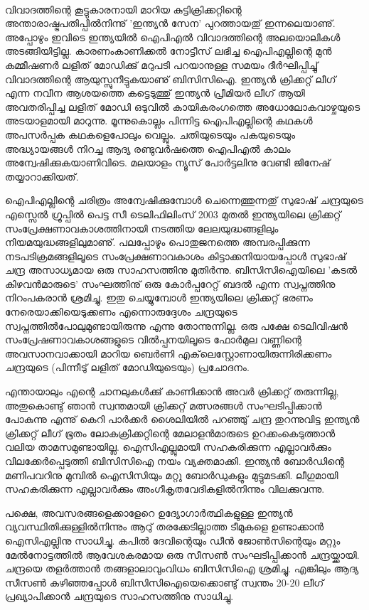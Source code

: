 ﻿
\enlargethispage{2\baselineskip}
\vskip 4pt

‌\hspace*{2em}\parbox{8.5cm}{
\small
വിവാദത്തിന്റെ കൂട്ടുകാരനായി മാറിയ കുട്ടിക്രിക്കറ്റിന്റെ അന്താരാഷ്ട്രപതിപ്പില്‍നിന്നു് 'ഇന്ത്യന്‍ സേന' പുറത്തായതു് 
ഇന്നലെയാണു്. അപ്പോഴും ഇവിടെ ഇന്ത്യയില്‍ ഐപിഎല്‍ വിവാദത്തിന്റെ അലയൊലികള്‍ അടങ്ങിയിട്ടില്ല. 
കാരണംകാണിക്കല്‍ നോട്ടീസ് ലഭിച്ച ഐപിഎല്ലിന്റെ മുന്‍ കമ്മീഷണര്‍ ലളിത് മോഡിക്കു് മറുപടി പറയാനുള്ള 
സമയം ദീര്‍ഘിപ്പിച്ചു് വിവാദത്തിന്റെ ആയുസ്സുനീട്ടുകയാണു് ബിസിസിഐ. ഇന്ത്യന്‍ ക്രിക്കറ്റ് ലീഗ് എന്ന നവീന 
ആശയത്തെ കട്ടെടുത്തു് ഇന്ത്യന്‍ പ്രീമിയര്‍ ലീഗ് ആയി അവതരിപ്പിച്ച ലളിത് മോഡി ഒടുവില്‍ കായികരംഗത്തെ 
അധോലോകവാഴ്ചയുടെ അടയാളമായി മാറുന്നു. മൂന്നുകൊല്ലം പിന്നിട്ട ഐപിഎല്ലിന്റെ കഥകള്‍ 
അപസര്‍പ്പക കഥകളെപോലും വെല്ലും. ചതിയുടെയും പകയുടെയും അദ്ധ്യായങ്ങള്‍ നിറച്ച ആദ്യ രണ്ടുവര്‍ഷത്തെ ഐപിഎല്‍ കാലം 
അന്വേഷിക്കുകയാണിവിടെ.  മലയാളം ന്യൂസ് പോര്‍ട്ടലിനു വേണ്ടി ജിനേഷ് തയ്യാറാക്കിയത്.
}

\vskip 14pt

\hspace*{-1.5em}ഐപിഎല്ലിന്റെ ചരിത്രം അന്വേഷിക്കുമ്പോള്‍ ചെന്നെത്തുന്നതു് സുഭാഷ് ചന്ദ്രയുടെ എസ്സെല്‍ ഗ്രൂപ്പില്‍ പെട്ട സീ ടെലിഫിലിംസ് 
2003 മുതല്‍ ഇന്ത്യയിലെ ക്രിക്കറ്റ് സംപ്രേക്ഷണാവകാശത്തിനായി നടത്തിയ ലേലയുദ്ധങ്ങളിലും നിയമയുദ്ധങ്ങളിലുമാണു്. 
പലപ്പോഴും പൊതുജനത്തെ അമ്പരപ്പിക്കുന്ന നടപടിക്രമങ്ങളിലൂടെ സംപ്രേക്ഷണാവകാശം കിട്ടാക്കനിയായപ്പോള്‍ 
സുഭാഷ് ചന്ദ്ര അസാധ്യമായ ഒരു സാഹസത്തിനു മുതിര്‍ന്നു. ബിസിസിഐയിലെ 'കടല്‍ കിഴവന്‍മാരുടെ' സംഘത്തിനു് 
ഒരു കോര്‍പ്പറേറ്റ് ബദല്‍ എന്ന സ്വപ്നത്തിനു നിറംപകരാന്‍ ശ്രമിച്ചു. ഇതു ചെയ്യുമ്പോള്‍ ഇന്ത്യയിലെ ക്രിക്കറ്റ് ഭരണം 
നേരെയാക്കിയെടുക്കണം എന്നൊരുദ്ദേശം ചന്ദ്രയുടെ സ്വപ്നത്തില്‍പോലുമുണ്ടായിരുന്നു എന്നു തോന്നുന്നില്ല. ഒരു പക്ഷേ 
ടെലിവിഷന്‍ സംപ്രേഷണാവകാശങ്ങളുടെ വില്‍പ്പനയിലൂടെ ഫോര്‍മുല വണ്ണിന്റെ അവസാനവാക്കായി മാറിയ ബെര്‍ണി 
എക്‌ലെസ്റ്റോണായിരുന്നിരിക്കണം ചന്ദ്രയുടെ (പിന്നീടു് ലളിത് മോഡിയുടെയും) പ്രചോദനം.

എന്തായാലും എന്റെ ചാനലുകള്‍ക്കു് കാണിക്കാന്‍ അവര്‍ ക്രിക്കറ്റ് തരുന്നില്ല, അതുകൊണ്ടു് ഞാന്‍ സ്വന്തമായി 
ക്രിക്കറ്റ് മത്സരങ്ങള്‍ സംഘടിപ്പിക്കാന്‍ പോകുന്നു എന്നു് കെറി പാര്‍ക്കര്‍ ശൈലിയില്‍ പറഞ്ഞു് ചന്ദ്ര തുറന്നുവിട്ട ഇന്ത്യന്‍ 
ക്രിക്കറ്റ് ലീഗ് ഭൂതം ലോകക്രിക്കറ്റിന്റെ മേലാളന്‍മാരുടെ ഉറക്കംകെടുത്താന്‍ വലിയ താമസമുണ്ടായില്ല. ഐസിഎല്ലുമായി 
സഹകരിക്കുന്ന എല്ലാവര്‍ക്കും വിലക്കേര്‍പ്പെടുത്തി ബിസിസിഐ നയം വ്യക്തമാക്കി. ഇന്ത്യന്‍ ബോര്‍ഡിന്റെ മണിപവറിനു 
മുമ്പില്‍ ഐസിസിയും മറ്റു ബോര്‍ഡുകളും മുട്ടുമടക്കി. ലീഗുമായി സഹകരിക്കുന്ന എല്ലാവര്‍ക്കും അംഗീകൃതവേദികളില്‍നിന്നും 
വിലക്കുവന്നു.

പക്ഷെ, അവസരങ്ങളെക്കാളേറെ ഉദ്യോഗാര്‍ത്ഥികളുള്ള ഇന്ത്യന്‍ വ്യവസ്ഥിതിക്കുള്ളില്‍നിന്നും ആറു് തരക്കേടില്ലാത്ത 
ടീമുകളെ ഉണ്ടാക്കാന്‍ ഐസിഎല്ലിനു സാധിച്ചു. കപില്‍ ദേവിന്റെയും ഡീന്‍ ജോണ്‍സിന്റെയും മറ്റും മേല്‍നോട്ടത്തില്‍ 
ആവേശകരമായ ഒരു സീസണ്‍ സംഘടിപ്പിക്കാന്‍ ചന്ദ്രയ്ക്കായി. ചന്ദ്രയെ തളര്‍ത്താന്‍ തങ്ങളാലാവുംവിധം ബിസിസിഐ 
ശ്രമിച്ചു. എങ്കിലും ആദ്യ സീസണ്‍ കഴിഞ്ഞപ്പോള്‍ ബിസിസിഐയെക്കൊണ്ടു് സ്വന്തം 20-20 ലീഗ് പ്രഖ്യാപിക്കാന്‍ ചന്ദ്രയുടെ 
സാഹസത്തിനു സാധിച്ചു.

